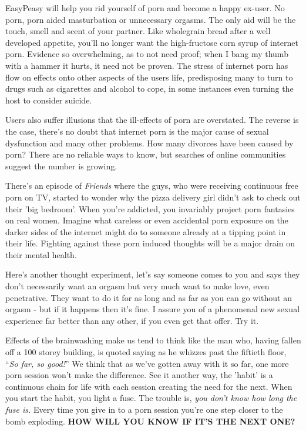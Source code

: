 \documentclass[
]{book}
\begin{document}
EasyPeasy will help you rid yourself of porn and become a happy ex-user. No porn, porn aided masturbation or unnecessary orgasms. The only aid will be the touch, smell and scent of your partner. Like wholegrain bread after a well developed appetite, you'll no longer want the high-fructose corn syrup of internet porn. Evidence so overwhelming, as to not need proof; when I bang my thumb with a hammer it hurts, it need not be proven. The stress of internet porn has flow on effects onto other aspects of the users life, predisposing many to turn to drugs such as cigarettes and alcohol to cope, in some instances even turning the host to consider suicide.

Users also suffer illusions that the ill-effects of porn are overstated. The reverse is the case, there's no doubt that internet porn is the major cause of sexual dysfunction and many other problems. How many divorces have been caused by porn? There are no reliable ways to know, but searches of online communities suggest the number is growing.

There's an episode of \emph{Friends} where the guys, who were receiving continuous free porn on TV, started to wonder why the pizza delivery girl didn't ask to check out their 'big bedroom'. When you're addicted, you invariably project porn fantasies on real women. Imagine what careless or even accidental porn exposure on the darker sides of the internet might do to someone already at a tipping point in their life. Fighting against these porn induced thoughts will be a major drain on their mental health.

Here's another thought experiment, let's say someone comes to you and says they don't necessarily want an orgasm but very much want to make love, even penetrative. They want to do it for as long and as far as you can go without an orgasm - but if it happens then it's fine. I assure you of a phenomenal new sexual experience far better than any other, if you even get that offer. Try it.

Effects of the brainwashing make us tend to think like the man who, having fallen off a 100 storey building, is quoted saying as he whizzes past the fiftieth floor, ``\emph{So far, so good!}'' We think that as we've gotten away with it so far, one more porn session won't make the difference. See it another way, the 'habit' is a continuous chain for life with each session creating the need for the next. When you start the habit, you light a fuse. The trouble is, \emph{you don't know how long the fuse is.} Every time you give in to a porn session you're one step closer to the bomb exploding. \textbf{HOW WILL YOU KNOW IF IT'S THE NEXT ONE?}
\end{document}
